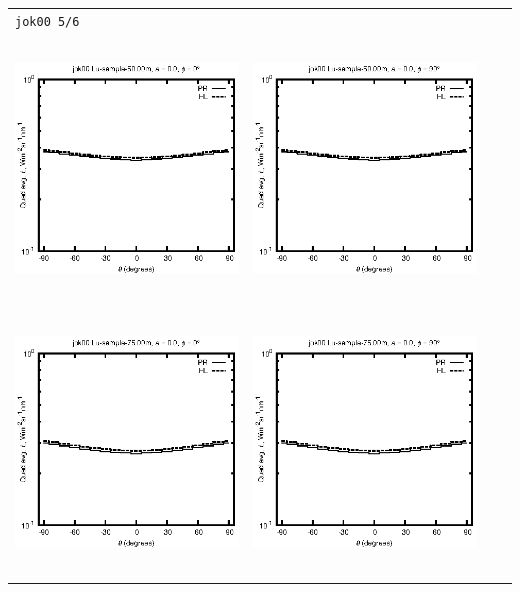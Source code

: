 \documentclass[10pt,a4paper]{article}
\begin{document}
\begin{adjustwidth}{-1.2in}{-1.2in}
\begin{tabular}{c c c c}
\multicolumn{4}{l}{\texttt{jok00 5/6}} \\
\includegraphics[height=7cm]{../eps/jok00_Lu_sample_50.00m_fwd.eps} &
\includegraphics[height=7cm]{../eps/jok00_Lu_sample_50.00m_cross.eps} \\
\includegraphics[height=7cm]{../eps/jok00_Lu_sample_75.00m_fwd.eps} &
\includegraphics[height=7cm]{../eps/jok00_Lu_sample_75.00m_cross.eps} \\

\end{tabular}
\end{adjustwidth}
\end{document}
